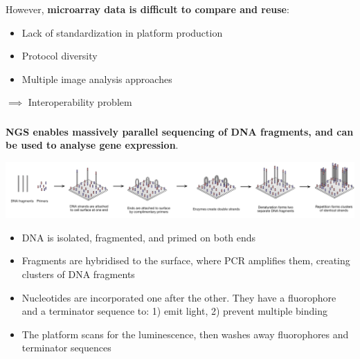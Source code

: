 \documentclass[x11names, svgnames]{beamer}
\begin{document}
\begin{frame}
  \frametitle{\three}
  However, \textbf{microarray data is difficult to compare and reuse}:\newline
  \begin{itemize}
    \itemsep1em
    \item Lack of standardization in platform production
    \item Protocol diversity
    \item Multiple image analysis approaches
  \end{itemize}
  \vspace{2.0em}
  $\implies$ Interoperability problem
\end{frame}

\begin{frame}
  \frametitle{\three}
  \parbox{\linewidth}{\textbf{NGS enables massively parallel sequencing of DNA fragments, and can be used to analyse gene expression}.}
  \begin{center}
    \hspace*{-2.5em}
    \includegraphics[scale=0.3]{images/atdbio_bridging_pcr}
  \end{center}
  \begin{itemize}
    \item DNA is isolated, fragmented, and primed on both ends
    \item Fragments are hybridised to the surface, where PCR amplifies them, creating clusters of DNA fragments
    \item Nucleotides are incorporated one after the other. They have a fluorophore and a terminator sequence to: 1) emit light, 2) prevent multiple binding
    \item The platform scans for the luminescence, then washes away fluorophores and terminator sequences
  \end{itemize}
\end{frame}
\end{document}
